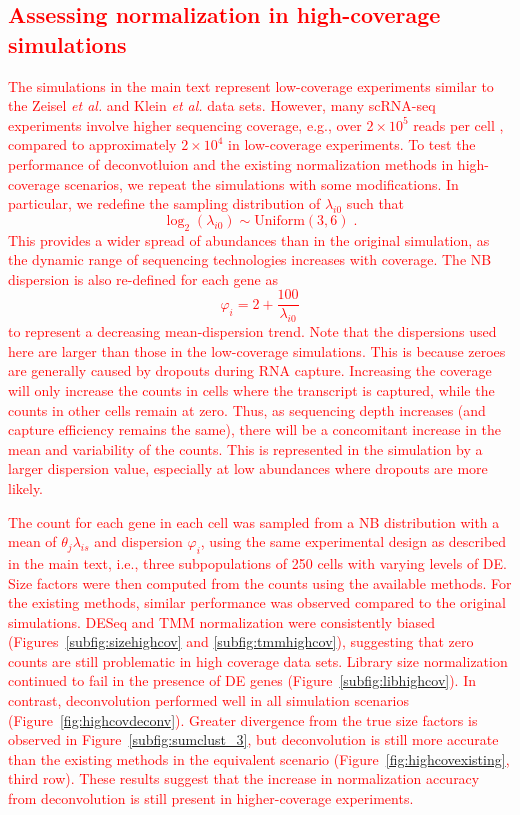 \documentclass{article}
\newcommand\revised[1]{\textcolor{red}{#1}}
\begin{document}
\revised{\section{Assessing normalization in high-coverage simulations}
The simulations in the main text represent low-coverage experiments similar to the Zeisel \textit{et al.} and Klein \textit{et al.} data sets.
However, many scRNA-seq experiments involve higher sequencing coverage, e.g., over $2\times 10^5$ reads per cell \cite{kolod2015single}, compared to approximately $2\times10^4$ in low-coverage experiments.
To test the performance of deconvotluion and the existing normalization methods in high-coverage scenarios, we repeat the simulations with some modifications.
In particular, we redefine the sampling distribution of $\lambda_{i0}$ such that 
\[
    \log_2(\lambda_{i0}) \sim \mbox{Uniform}(3, 6) \;.
\]
This provides a wider spread of abundances than in the original simulation, as the dynamic range of sequencing technologies increases with coverage.
The NB dispersion is also re-defined for each gene as 
\[
    \varphi_i = 2 + \frac{100}{\lambda_{i0}}
\]
to represent a decreasing mean-dispersion trend.
Note that the dispersions used here are larger than those in the low-coverage simulations.
This is because zeroes are generally caused by dropouts during RNA capture.
Increasing the coverage will only increase the counts in cells where the transcript is captured, while the counts in other cells remain at zero.
Thus, as sequencing depth increases (and capture efficiency remains the same), there will be a concomitant increase in the mean and variability of the counts.
This is represented in the simulation by a larger dispersion value, especially at low abundances where dropouts are more likely.}

\revised{The count for each gene in each cell was sampled from a NB distribution with a mean of $\theta_{j}\lambda_{is}$ and dispersion $\varphi_i$, using the same experimental design as described in the main text, i.e., three subpopulations of 250 cells with varying levels of DE.
Size factors were then computed from the counts using the available methods.
For the existing methods, similar performance was observed compared to the original simulations.
DESeq and TMM normalization were consistently biased (Figures~\ref{subfig:sizehighcov} and \ref{subfig:tmmhighcov}), suggesting that zero counts are still problematic in high coverage data sets.
Library size normalization continued to fail in the presence of DE genes (Figure~\ref{subfig:libhighcov}).
In contrast, deconvolution performed well in all simulation scenarios (Figure~\ref{fig:highcovdeconv}).
Greater divergence from the true size factors is observed in Figure~\ref{subfig:sumclust_3}, but deconvolution is still more accurate than the existing methods in the equivalent scenario (Figure~\ref{fig:highcovexisting}, third row).
These results suggest that the increase in normalization accuracy from deconvolution is still present in higher-coverage experiments.
}
\end{document}
